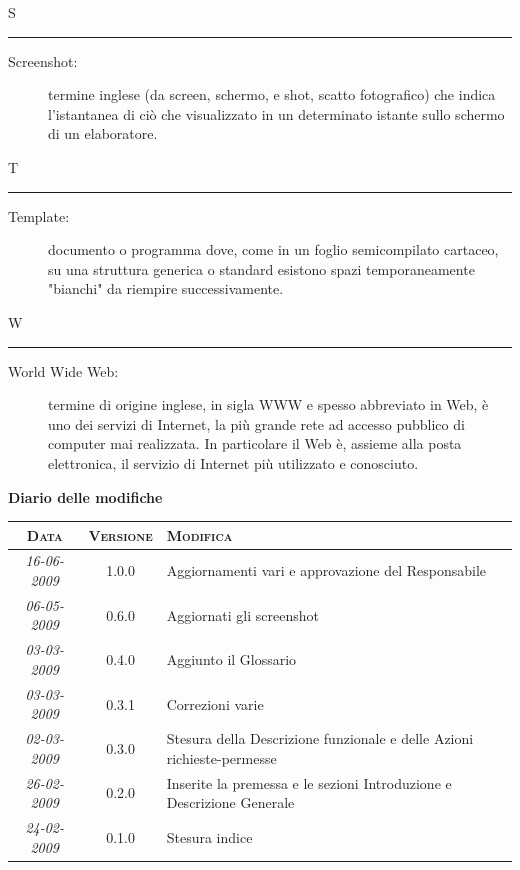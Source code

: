 \documentclass[11pt,a4paper]{article}
\newcommand{\modifiche} 
{
\newpage
\begin{center}
\textbf{Diario delle modifiche} \\
\bigskip
\begin{tabular}{|c|c|p{0.62\textwidth}|}
\hline
\textsc{Data} & \textsc{Versione} & \textsc{Modifica} \\
\hline
\hline
\textit{16-06-2009} & 1.0.0 & Aggiornamenti vari e approvazione del Responsabile\\
\hline
\textit{06-05-2009} & 0.6.0 & Aggiornati gli screenshot\\
\hline
\textit{03-03-2009} & 0.4.0 & Aggiunto il Glossario\\
\hline
\textit{03-03-2009} & 0.3.1 & Correzioni varie\\
\hline
\textit{02-03-2009} & 0.3.0 & Stesura  della Descrizione funzionale e delle Azioni richieste-permesse\\
\hline
\textit{26-02-2009} & 0.2.0 & Inserite la premessa e le sezioni Introduzione e Descrizione Generale\\
\hline
\textit{24-02-2009} & 0.1.0 & Stesura indice\\
\hline
\end{tabular}
\end{center}
}
\begin{document}
\bigskip
\Huge S \bigskip
\hrule
\smallskip
\normalsize
\begin{description}
	\item[Screenshot:] termine inglese (da screen, schermo, e shot, scatto fotografico) che indica l'istantanea di ciò che visualizzato in un determinato istante sullo schermo di un elaboratore.
\end{description}
\bigskip
\Huge T \bigskip
\hrule
\smallskip
\normalsize
\begin{description}
	\item[Template:] documento o programma dove, come in un foglio semicompilato cartaceo, su una struttura generica o standard esistono spazi temporaneamente "bianchi" da riempire successivamente.
\end{description}
\bigskip
\Huge W \bigskip
\hrule
\smallskip
\normalsize
\begin{description}
	\item[World Wide Web:] termine di origine inglese, in sigla WWW e spesso abbreviato in Web, è uno dei servizi di Internet, la più grande rete ad accesso pubblico di computer mai realizzata. In particolare il Web è, assieme alla posta elettronica, il servizio di Internet più utilizzato e conosciuto.
\end{description}
\modifiche
\end{document}
